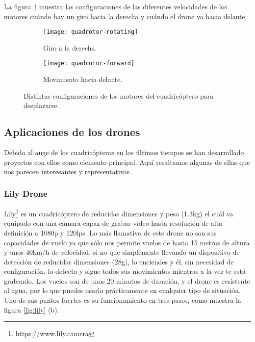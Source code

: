 La figura \ref{fig:quadrotor_movements} muestra las configuraciones de las diferentes velocidades de los motores cuándo hay un giro hacia la derecha y cuándo el drone va hacia delante.\\

\begin{figure}[h!]
\centering
  \begin{subfigure}[]{60mm}
    \texttt{[image: quadrotor-rotating]}
    \caption{Giro a la derecha.} 
  \end{subfigure}
  \hspace{5pt}
  \begin{subfigure}[]{60mm}
    \texttt{[image: quadrotor-forward]}
    \caption{Movimiento hacia delante.}
  \end{subfigure}
  \caption{Distintas configuraciones de los motores del cuadricóptero para desplazarse.}\label{fig:quadrotor_movements}
\end{figure}


\subsection{Aplicaciones de los drones}

Debido al auge de los cuadricópteros en los últimos tiempos se han desarrollado proyectos con ellos como elemento principal. Aquí resaltamos algunas de ellas que nos parecen interesantes y representativas.\\

\subsubsection{Lily Drone} 

Lily\footnote{https://www.lily.camera} es un cuadricóptero de reducidas dimensiones y peso (1.3kg) el cuál va equipado con una cámara capaz de grabar vídeo hasta resolución de alta definición a 1080p y 120fps. Lo más llamativo de este drone no son sus capacidades de vuelo ya que sólo nos permite vuelos de hasta 15 metros de altura y unos 40km/h de velocidad, si no que simplemente llevando un dispositivo de detección de reducidas dimensiones (28g), lo enciendes y él, sin necesidad de configuración, lo detecta y sigue todos sus movimientos mientras a la vez te está grabando. Los vuelos son de unos 20 minutos de duración, y el drone es resistente al agua, por lo que puedes usarlo prácticamente en cualquier tipo de situación. Uno de sus puntos fuertes es su funcionamiento en tres pasos, como muestra la figura \ref{fig:lily} (b).\\

